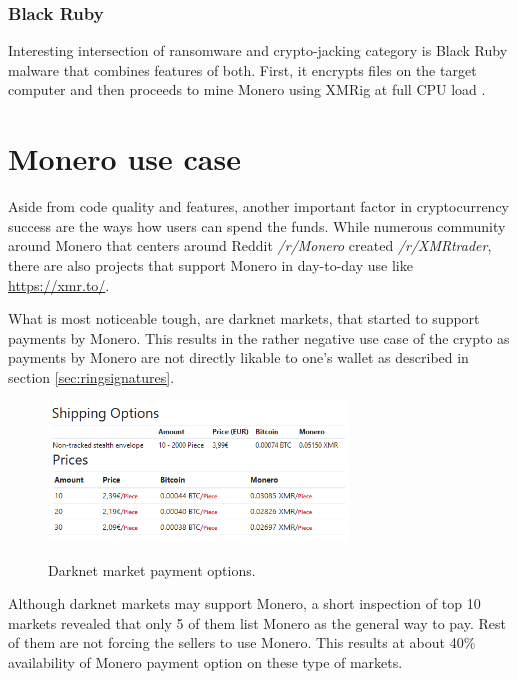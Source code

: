 \documentclass[
  printed, %
  table,   %
  nolof,     %
  nolot,     %
           oneside, color
]{fithesis3}
\begin{document}
\subsubsection{Black Ruby}
Interesting intersection of ransomware and crypto-jacking category is Black Ruby malware that combines features of both. First, it encrypts files on the target computer and then proceeds to mine Monero using XMRig at full CPU load \cite{blackruby2018}.

\vspace{-1em}
\section{Monero use case}
Aside from code quality and features, another important factor in cryptocurrency success are the ways how users can spend the funds. While numerous community around Monero that centers around Reddit \textit{/r/Monero} created \textit{/r/XMRtrader}, there are also projects that support Monero in day-to-day use like \url{https://xmr.to/}.

What is most noticeable tough, are darknet markets, that started to support payments by Monero. This results in the rather negative use case of the crypto as payments by Monero are not directly likable to one's wallet as described in section \ref{sec:ringsignatures}.

\begin{figure}[H]
\begin{center}

    \vspace{-0.8em}
 \includegraphics[trim={0 1.8cm 0 0},clip,width=0.71\textwidth]{Screenshot_360.png}
    \caption{Darknet market payment options.}
    \vspace{-1.5em}
    \label{pic:withoutresdrawable}
\end{center}
    \end{figure}


Although darknet markets may support Monero, a short inspection of top 10 markets revealed that only 5 of them list Monero as the general way to pay. Rest of them are not forcing the sellers to use Monero. This results at about 40\% availability of Monero payment option on these type of markets.
\end{document}
